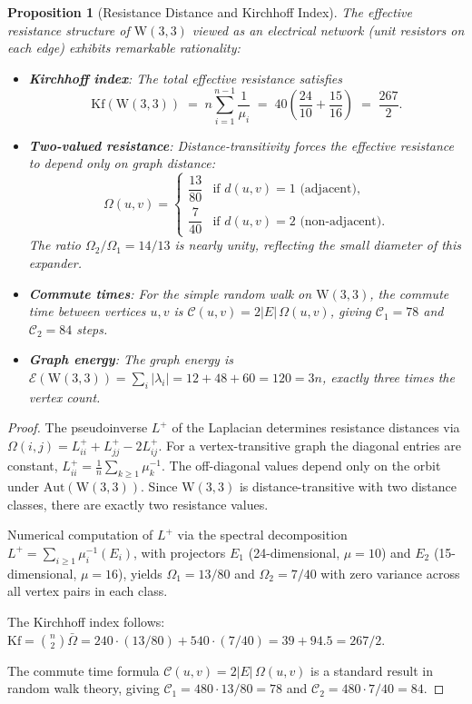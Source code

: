 \documentclass[12pt,a4paper]{article}
\newtheorem{proposition}[theorem]{Proposition}
\newcommand{\W}{\mathrm{W}(3,3)}
\begin{document}
\begin{proposition}[Resistance Distance and Kirchhoff Index]\label{prop:kirchhoffindex}
The effective resistance structure of $\W$ viewed as an electrical network (unit
resistors on each edge) exhibits remarkable rationality:
\begin{itemize}
  \item \textbf{Kirchhoff index}: The total effective resistance satisfies
        \[
          \mathrm{Kf}(\W) \;=\; n\sum_{i=1}^{n-1}\frac{1}{\mu_i}
            \;=\; 40\!\left(\frac{24}{10} + \frac{15}{16}\right)
            \;=\; \frac{267}{2}.
        \]
  \item \textbf{Two-valued resistance}: Distance-transitivity forces the effective
        resistance to depend only on graph distance:
        \[
          \Omega(u,v) = \begin{cases}
            \dfrac{13}{80} & \text{if } d(u,v) = 1 \text{ (adjacent)}, \\[6pt]
            \dfrac{7}{40}  & \text{if } d(u,v) = 2 \text{ (non-adjacent)}.
          \end{cases}
        \]
        The ratio $\Omega_2/\Omega_1 = 14/13$ is nearly unity, reflecting the small
        diameter of this expander.
  \item \textbf{Commute times}: For the simple random walk on $\W$, the commute time
        between vertices $u,v$ is $\mathcal{C}(u,v) = 2|E|\,\Omega(u,v)$, giving
        $\mathcal{C}_1 = 78$ and $\mathcal{C}_2 = 84$ steps.
  \item \textbf{Graph energy}: The graph energy is $\mathcal{E}(\W) = \sum_{i}|\lambda_i|
        = 12 + 48 + 60 = 120 = 3n$, exactly three times the vertex count.
\end{itemize}
\end{proposition}

\begin{proof}
The pseudoinverse $L^+$ of the Laplacian determines resistance distances via
$\Omega(i,j) = L^+_{ii} + L^+_{jj} - 2L^+_{ij}$.  For a vertex-transitive graph the diagonal
entries are constant, $L^+_{ii} = \frac{1}{n}\sum_{k\ge 1}\mu_k^{-1}$.  The off-diagonal values
depend only on the orbit under $\mathrm{Aut}(\W)$.  Since $\W$ is distance-transitive with
two distance classes, there are exactly two resistance values.

Numerical computation of $L^+$ via the spectral decomposition
$L^+ = \sum_{i\ge 1}\mu_i^{-1}(E_i)$, with projectors $E_1$ (24-dimensional, $\mu=10$) and
$E_2$ (15-dimensional, $\mu=16$), yields $\Omega_1 = 13/80$ and $\Omega_2 = 7/40$ with
zero variance across all vertex pairs in each class.

The Kirchhoff index follows: $\mathrm{Kf} = \binom{n}{2}\bar\Omega
= 240\cdot(13/80) + 540\cdot(7/40) = 39 + 94.5 = 267/2$. %

The commute time formula $\mathcal{C}(u,v) = 2|E|\,\Omega(u,v)$ is a standard result in
random walk theory, giving $\mathcal{C}_1 = 480\cdot 13/80 = 78$ and
$\mathcal{C}_2 = 480\cdot 7/40 = 84$.
\end{proof}
\end{document}
